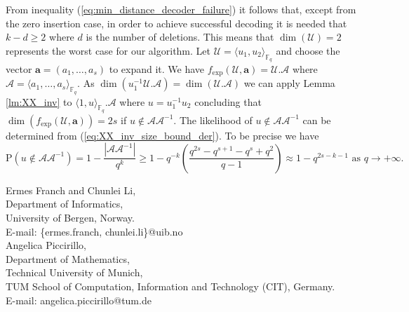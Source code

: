 \documentclass{article}
\newcommand{\Fq}{\mathbb{F}_{q}}
\newcommand{\calA}{\mathcal{A}}
\newcommand{\calU}{\mathcal{U}}
\newcommand{\fexp}{f_{\mathrm{exp}}}
\newcommand{\Span}[2]{\langle #2 \rangle_{#1}}
\begin{document}
\par From inequality (\ref{eq:min_distance_decoder_failure}) it follows that, except from the zero insertion case, in order to achieve successful decoding it is needed that $k-d \geq 2$ where $d$ is the number of deletions.
This means that $\dim(\calU) = 2$ represents the worst case for our algorithm.
Let $\calU = \Span{\Fq}{u_1, u_2}$ and choose the vector $\bm a = (a_1,\ldots,a_s)$ to expand it. 
We have $\fexp(\calU,\bm a) = \calU.\calA$ where $\calA = \Span{\Fq}{a_1, \ldots, a_s}$.
As $\dim(u_1^{-1}\calU.\calA) = \dim(\calU.\calA)$ we can apply Lemma \ref{lm:XX_inv} to $\Span{\Fq}{1, u}.\calA$  where $u = u_1^{-1} u_2$ concluding that $\dim(\fexp(\calU,\bm a)) = 2s$ if $u \notin \calA \calA^{-1}$.
The likelihood of $u \notin \calA \calA^{-1}$ can be determined from (\ref{eq:XX_inv_size_bound_der}).
To be precise we have 
\begin{equation}
\label{eq:precise perfect growth probability}
    \mathrm{P}(u \notin \calA \calA^{-1}) = 1 - \frac{|\calA \calA^{-1}|}{q^k} \geq  1  - q^{-k} \left (\frac{q^{2s}-q^{s+1}-q^s+q^2}{q-1}\right) \approx 1 - q^{2s - k - 1}\text{ as }q\to+\infty.
\end{equation}

\bigskip

\noindent Ermes Franch and Chunlei Li,\\
Department of Informatics,\\ 
University of Bergen, Norway.\\
E-mail: \{ermes.franch, chunlei.li\}@uib.no\\

\medskip
\noindent Angelica Piccirillo,\\
Department of Mathematics,\\ 
Technical University of Munich,\\
TUM School of Computation, Information
and Technology (CIT), Germany.\\ 
E-mail: angelica.piccirillo@tum.de
\end{document}
